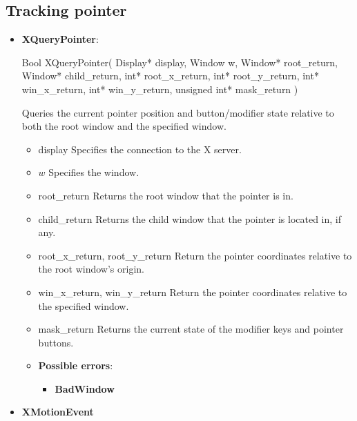 \documentclass{report}
\begin{document}
    \pagebreak 
    \subsection{Tracking pointer}
    \begin{itemize}
        \item \textbf{XQueryPointer}: 
            \bigbreak \noindent 
            \begin{cppcode}
                Bool XQueryPointer(
                    Display* display,
                    Window w,
                    Window* root_return, Window* child_return,
                    int* root_x_return, int* root_y_return,
                    int* win_x_return, int* win_y_return,
                    unsigned int* mask_return
                )
            \end{cppcode}
            \bigbreak \noindent
            Queries the current pointer position and button/modifier state relative to both the root window and the specified window.
            \begin{itemize}
                \item display Specifies the connection to the X server.
                \item $w$ Specifies the window.
                \item root\_return Returns the root window that the pointer is in.
                \item child\_return Returns the child window that the pointer is located in, if any.
                \item root\_x\_return, root\_y\_return Return the pointer coordinates relative to the root window’s origin.
                \item win\_x\_return, win\_y\_return Return the pointer coordinates relative to the specified window.
                \item mask\_return Returns the current state of the modifier keys and pointer buttons.
            \end{itemize}
            \begin{itemize}
                \item \textbf{Possible errors}:
                    \begin{itemize}
                        \item \textbf{BadWindow}
                    \end{itemize}
            \end{itemize}
        \item \textbf{XMotionEvent}

\end{itemize}
\end{document}
